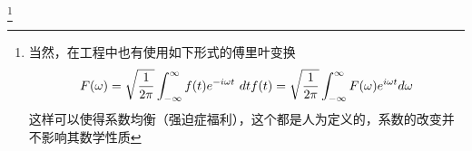 \footnote{当然，在工程中也有使用如下形式的傅里叶变换
				$$
				F(\omega)=\sqrt{\dfrac{1}{2\pi}}\int_{-\infty}^{\infty}f(t)e^{-i\omega t}\ dt\\
				f(t)=\sqrt{\dfrac{1}{2\pi}}\int_{-\infty}^{\infty}F(\omega) e^{i\omega t} d\omega
				$$
				这样可以使得系数均衡（强迫症福利），这个都是人为定义的，系数的改变并不影响其数学性质}